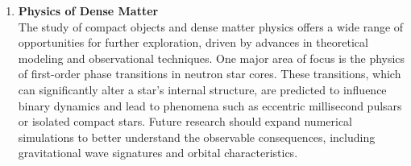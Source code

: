 \documentclass[main.tex]{subfiles}
\begin{document}
\begin{enumerate}
        \item \textbf{Physics of Dense Matter}\\
        The study of compact objects and dense matter physics offers a wide range of opportunities for further exploration, driven by advances in theoretical modeling and observational techniques. One major area of focus is the physics of first-order phase transitions in neutron star cores. These transitions, which can significantly alter a star’s internal structure, are predicted to influence binary dynamics and lead to phenomena such as eccentric millisecond pulsars or isolated compact stars. Future research should expand numerical simulations to better understand the observable consequences, including gravitational wave signatures and orbital characteristics.
        
    \end{enumerate}
    
\end{document}
